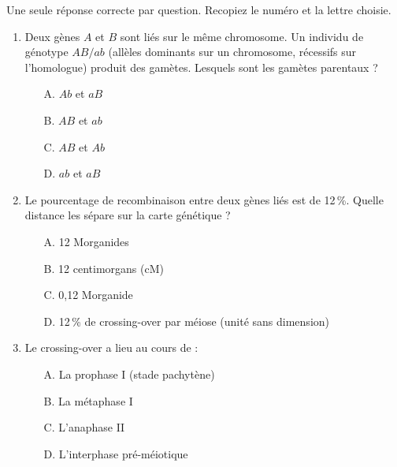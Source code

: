 \documentclass[11pt]{article}
\begin{document}
\begin{exercice}
Une seule réponse correcte par question. Recopiez le numéro et la lettre choisie.
\begin{enumerate}
    \item Deux gènes $A$ et $B$ sont liés sur le même chromosome. Un individu de génotype $AB/ab$ (allèles dominants sur un chromosome, récessifs sur l'homologue) produit des gamètes. Lesquels sont les gamètes parentaux ?
    \begin{itemize}
        \item[A.] $Ab$ et $aB$
        \item[B.] $AB$ et $ab$
        \item[C.] $AB$ et $Ab$
        \item[D.] $ab$ et $aB$
    \end{itemize}
    \item Le pourcentage de recombinaison entre deux gènes liés est de 12\,\%. Quelle distance les sépare sur la carte génétique ?
    \begin{itemize}
        \item[A.] 12 Morganides
        \item[B.] 12 centimorgans (cM)
        \item[C.] 0,12 Morganide
        \item[D.] 12\,\% de crossing-over par méiose (unité sans dimension)
    \end{itemize}
    \item Le crossing-over a lieu au cours de :
    \begin{itemize}
        \item[A.] La prophase I (stade pachytène)
        \item[B.] La métaphase I
        \item[C.] L'anaphase II
        \item[D.] L'interphase pré-méiotique
    \end{itemize}
\end{enumerate}
\end{exercice}
\end{document}
